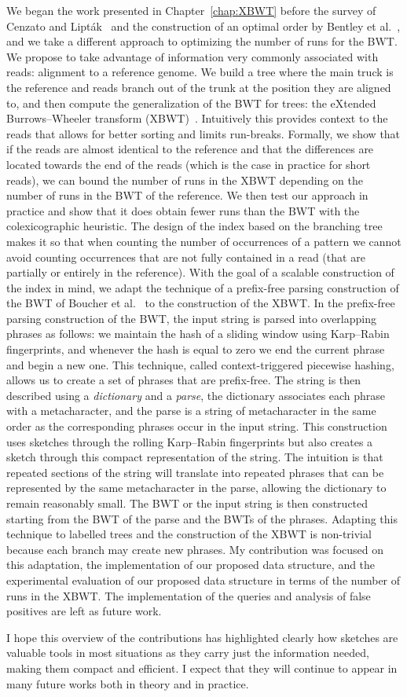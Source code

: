 We began the work presented in Chapter~\ref{chap:XBWT} before the survey of Cenzato and Lipták~\cite{cenzato_et_al_BWT_Collections} and the construction of an optimal order by Bentley et al.~\cite{bentley2019complexity}, and we take a different approach to optimizing the number of runs for the BWT. We propose to take advantage of information very commonly associated with reads: alignment to a reference genome. We build a tree where the main truck is the reference and reads branch out of the trunk at the position they are aligned to, and then compute the generalization of the BWT for trees: the eXtended Burrows--Wheeler transform (XBWT)~\cite{ferragina2009compressing}. Intuitively this provides context to the reads that allows for better sorting and limits run-breaks. Formally, we show that if the reads are almost identical to the reference and that the differences are located towards the end of the reads (which is the case in practice for short reads), we can bound the number of runs in the XBWT depending on the number of runs in the BWT of the reference. We then test our approach in practice and show that it does obtain fewer runs than the BWT with the colexicographic heuristic.
The design of the index based on the branching tree makes it so that when counting the number of occurrences of a pattern we cannot avoid counting occurrences that are not fully contained in a read (that are partially or entirely in the reference).
With the goal of a scalable construction of the index in mind, we adapt the technique of a prefix-free parsing construction of the BWT of Boucher et al.~\cite{boucher2019prefix} to the construction of the XBWT. 
In the prefix-free parsing construction of the BWT, the input string is parsed into overlapping phrases as follows: we maintain the hash of a sliding window using Karp--Rabin fingerprints, and whenever the hash is equal to zero we end the current phrase and begin a new one. This technique, called context-triggered piecewise hashing, allows us to create a set of phrases that are prefix-free.
The string is then described using a \emph{dictionary} and a \emph{parse}, the dictionary associates each phrase with a metacharacter, and the parse is a string of metacharacter in the same order as the corresponding phrases occur in the input string.
This construction uses sketches through the rolling Karp--Rabin fingerprints but also creates a sketch through this compact representation of the string.
The intuition is that repeated sections of the string will translate into repeated phrases that can be represented by the same metacharacter in the parse, allowing the dictionary to remain reasonably small.
The BWT or the input string is then constructed starting from the BWT of the parse and the BWTs of the phrases.
Adapting this technique to labelled trees and the construction of the XBWT is non-trivial because each branch may create new phrases. My contribution was focused on this adaptation, the implementation of our proposed data structure, and the experimental evaluation of our proposed data structure in terms of the number of runs in the XBWT. The implementation of the queries and analysis of false positives are left as future work.


I hope this overview of the contributions has highlighted clearly how sketches are valuable tools in most situations as they carry just the information needed, making them compact and efficient. I expect that they will continue to appear in many future works both in theory and in practice.